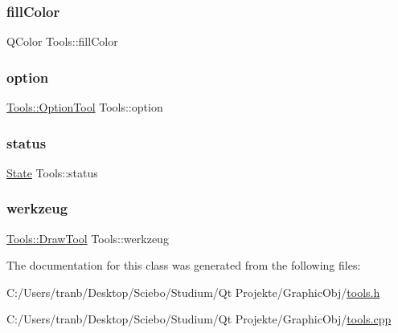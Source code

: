 \mbox{\label{class_tools_a522e6149eb1349df97fa1bb7abaec427}} 
\subsubsection{\texorpdfstring{fill\+Color}{fillColor}}
{\footnotesize\ttfamily Q\+Color Tools\+::fill\+Color\hspace{0.3cm}{\ttfamily [protected]}}

\mbox{\label{class_tools_a9bf140c9c0af40044aaa2c115b632399}} 
\subsubsection{\texorpdfstring{option}{option}}
{\footnotesize\ttfamily \hyperlink{class_tools_a4b55b2ca4eef4d80ae1042233832bb8b}{Tools\+::\+Option\+Tool} Tools\+::option\hspace{0.3cm}{\ttfamily [protected]}}

\mbox{\label{class_tools_a9ee6b69697a16133db9d1f24346cd838}} 
\subsubsection{\texorpdfstring{status}{status}}
{\footnotesize\ttfamily \hyperlink{class_tools_a2847c269682818722541d9002fdf0824}{State} Tools\+::status\hspace{0.3cm}{\ttfamily [protected]}}

\mbox{\label{class_tools_a8777299234b214fb917f42c0ef1a0ead}} 
\subsubsection{\texorpdfstring{werkzeug}{werkzeug}}
{\footnotesize\ttfamily \hyperlink{class_tools_ab031688a77e89a80ce8b5db7014684a3}{Tools\+::\+Draw\+Tool} Tools\+::werkzeug\hspace{0.3cm}{\ttfamily [protected]}}



The documentation for this class was generated from the following files\+:\begin{DoxyCompactItemize}
\item 
C\+:/\+Users/tranb/\+Desktop/\+Sciebo/\+Studium/\+Qt Projekte/\+Graphic\+Obj/\hyperlink{tools_8h}{tools.\+h}\item 
C\+:/\+Users/tranb/\+Desktop/\+Sciebo/\+Studium/\+Qt Projekte/\+Graphic\+Obj/\hyperlink{tools_8cpp}{tools.\+cpp}\end{DoxyCompactItemize}
